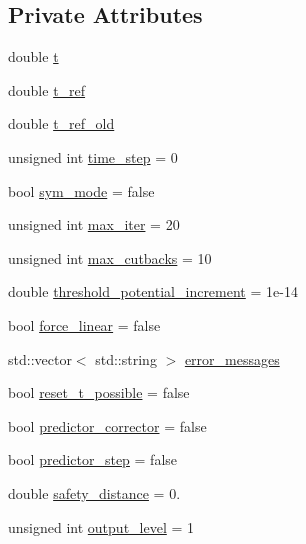 \subsection*{Private Attributes}
\begin{DoxyCompactItemize}
\item 
double \hyperlink{classincremental_f_e_1_1_global_data_incremental_f_e_abb14e15389af3772905a3c75e12ed2c0}{t}
\item 
double \hyperlink{classincremental_f_e_1_1_global_data_incremental_f_e_a6ddf751a2f8abff9353d12e469e38f96}{t\+\_\+ref}
\item 
double \hyperlink{classincremental_f_e_1_1_global_data_incremental_f_e_ad808aad6cdbfa6eddad05fb85c056d11}{t\+\_\+ref\+\_\+old}
\item 
unsigned int \hyperlink{classincremental_f_e_1_1_global_data_incremental_f_e_a2aa7544464ad55c39f44c9e7e04b4bf6}{time\+\_\+step} = 0
\item 
bool \hyperlink{classincremental_f_e_1_1_global_data_incremental_f_e_a9986ee5bfccc1b5936c585cf0c5a4474}{sym\+\_\+mode} = false
\item 
unsigned int \hyperlink{classincremental_f_e_1_1_global_data_incremental_f_e_ad15c334652b6a9d6843c360c6e2005ec}{max\+\_\+iter} = 20
\item 
unsigned int \hyperlink{classincremental_f_e_1_1_global_data_incremental_f_e_a7ae58573e9cc241a14976bf19351ba63}{max\+\_\+cutbacks} = 10
\item 
double \hyperlink{classincremental_f_e_1_1_global_data_incremental_f_e_a2f7adb8b4f7f8875715e1dbd0edd9ac8}{threshold\+\_\+potential\+\_\+increment} = 1e-\/14
\item 
bool \hyperlink{classincremental_f_e_1_1_global_data_incremental_f_e_a37c1d42902e74f13f3c4ba82d2dabd67}{force\+\_\+linear} = false
\item 
std\+::vector$<$ std\+::string $>$ \hyperlink{classincremental_f_e_1_1_global_data_incremental_f_e_a47301f72bcb3852b2519b23de833f3eb}{error\+\_\+messages}
\item 
bool \hyperlink{classincremental_f_e_1_1_global_data_incremental_f_e_a23a3040aa83a8867ccb0a8e88bb8cb9e}{reset\+\_\+t\+\_\+possible} = false
\item 
bool \hyperlink{classincremental_f_e_1_1_global_data_incremental_f_e_a5cc0d20e5e389c149bbd288f57dee953}{predictor\+\_\+corrector} = false
\item 
bool \hyperlink{classincremental_f_e_1_1_global_data_incremental_f_e_afe172fdb882f9dd0cd5f963386dd2ffb}{predictor\+\_\+step} = false
\item 
double \hyperlink{classincremental_f_e_1_1_global_data_incremental_f_e_a6db92e8e97c6875df1ecf5aa2a3a0345}{safety\+\_\+distance} = 0.
\item 
unsigned int \hyperlink{classincremental_f_e_1_1_global_data_incremental_f_e_a0d5cf3ecf70ec61771bbcfe45d0e6b5d}{output\+\_\+level} = 1
\end{DoxyCompactItemize}
